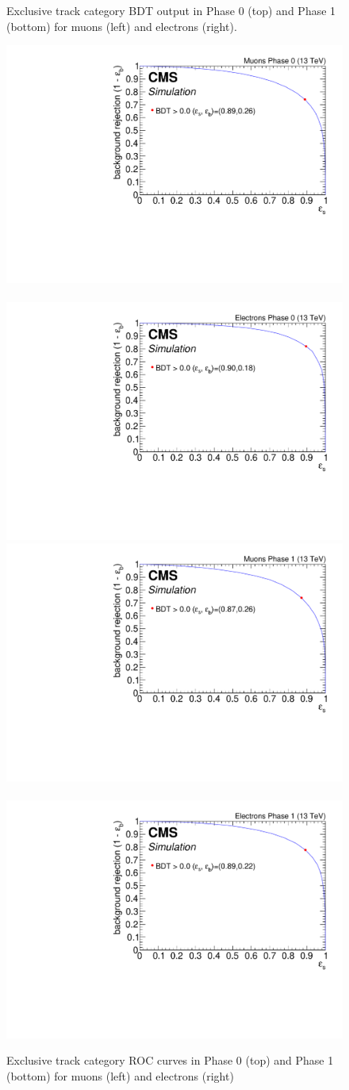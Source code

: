 \begin{figure}[!htb]
\caption[Exclusive track category BDT outputs]{Exclusive track category BDT output in Phase 0 (top) and Phase 1 (bottom) for muons (left) and electrons (right).}
\label{fig:event-bdt-ex-track-output}
\end{figure}

\begin{figure}[!htb]
\centering
\includegraphics[width=0.48\linewidth]{plots/extrack_bdt/roc_Event_Ex_Track_Muons_Phase_0.pdf} \,
\includegraphics[width=0.48\linewidth]{plots/extrack_bdt/roc_Event_Ex_Track_Electrons_Phase_0.pdf} \\

\includegraphics[width=0.48\linewidth]{plots/extrack_bdt/roc_Event_Ex_Track_Muons_Phase_1.pdf} \,
\includegraphics[width=0.48\linewidth]{plots/extrack_bdt/roc_Event_Ex_Track_Electrons_Phase_1.pdf} \\

\caption[Exclusive track category ROC curve]{Exclusive track category ROC curves in Phase 0 (top) and Phase 1 (bottom) for muons (left) and electrons (right)}
\label{fig:event-bdt-ex-track-roc}
\end{figure}

